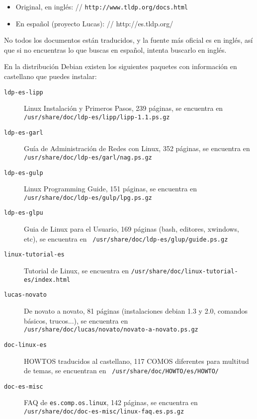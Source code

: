 \begin{itemize}

\item Original, en inglés: // {\tt http://www.tldp.org/docs.html}

\item En español (proyecto Lucas): // {http://es.tldp.org/} 

\end{itemize}

No todos los  documentos están traducidos, y la fuente  más oficial es
en inglés, así que si no  encuentras lo que buscas en español, intenta
buscarlo en inglés.

En  la  distribución  Debian   existen  los  siguientes  paquetes  con
información en castellano que puedes instalar:

\begin{description}

\item      [{\tt      ldp-es-lipp}]      Linux      Instalación      y
Primeros    Pasos,    239    páginas,    se    encuentra    en    {\tt
/usr/share/doc/ldp-es/lipp/lipp-1.1.ps.gz}

\item    [{\tt    ldp-es-garl}]     Guía    de    Administración    de
Redes    con   Linux,    352   páginas,    se   encuentra    en   {\tt
/usr/share/doc/ldp-es/garl/nag.ps.gz}

\item  [{\tt ldp-es-gulp}]  Linux Programming  Guide, 151  páginas, se
encuentra en {\tt /usr/share/doc/ldp-es/gulp/lpg.ps.gz}

\item  [{\tt  ldp-es-glpu}]  Guia  de   Linux  para  el  Usuario,  169
páginas  (bash,  editores,  xwindows,   etc),  se  encuentra  en  {\tt
/usr/share/doc/ldp-es/glup/guide.ps.gz}

\item  [{\tt linux-tutorial-es}]  Tutorial de  Linux, se  encuentra en
{\tt /usr/share/doc/linux-tutorial-es/index.html}

\item   [{\tt  lucas-novato}]   De   novato  a   novato,  81   páginas
(instalaciones  debian 1.3  y  2.0, comandos  básicos, trucos...),  se
encuentra en {\tt /usr/share/doc/lucas/novato/novato-a-novato.ps.gz}

\item  [{\tt  doc-linux-es}]  HOWTOS  traducidos  al  castellano,  117
COMOS  diferentes  para  multitud  de temas,  se  encuentran  en  {\tt
/usr/share/doc/HOWTO/es/HOWTO/}

\item [{\tt doc-es-misc}] FAQ  de {\tt es.comp.os.linux}, 142 páginas,
se encuentra en {\tt /usr/share/doc/doc-es-misc/linux-faq.es.ps.gz}

\end{description}

